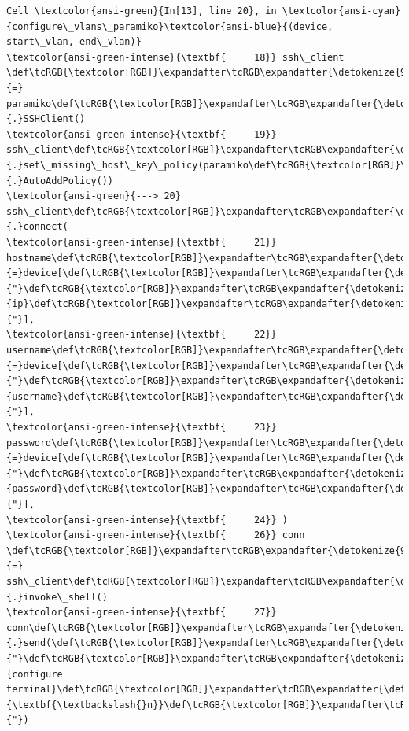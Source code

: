 \documentclass[11pt]{article}
\begin{document}
\begin{Verbatim}[commandchars=\\\{\}, frame=single, framerule=2mm, rulecolor=\color{outerrorbackground}]
Cell \textcolor{ansi-green}{In[13], line 20}, in \textcolor{ansi-cyan}{configure\_vlans\_paramiko}\textcolor{ansi-blue}{(device, start\_vlan, end\_vlan)}
\textcolor{ansi-green-intense}{\textbf{     18}} ssh\_client \def\tcRGB{\textcolor[RGB]}\expandafter\tcRGB\expandafter{\detokenize{98,98,98}}{=} paramiko\def\tcRGB{\textcolor[RGB]}\expandafter\tcRGB\expandafter{\detokenize{98,98,98}}{.}SSHClient()
\textcolor{ansi-green-intense}{\textbf{     19}} ssh\_client\def\tcRGB{\textcolor[RGB]}\expandafter\tcRGB\expandafter{\detokenize{98,98,98}}{.}set\_missing\_host\_key\_policy(paramiko\def\tcRGB{\textcolor[RGB]}\expandafter\tcRGB\expandafter{\detokenize{98,98,98}}{.}AutoAddPolicy())
\textcolor{ansi-green}{---> 20} ssh\_client\def\tcRGB{\textcolor[RGB]}\expandafter\tcRGB\expandafter{\detokenize{98,98,98}}{.}connect(
\textcolor{ansi-green-intense}{\textbf{     21}}     hostname\def\tcRGB{\textcolor[RGB]}\expandafter\tcRGB\expandafter{\detokenize{98,98,98}}{=}device[\def\tcRGB{\textcolor[RGB]}\expandafter\tcRGB\expandafter{\detokenize{175,0,0}}{"}\def\tcRGB{\textcolor[RGB]}\expandafter\tcRGB\expandafter{\detokenize{175,0,0}}{ip}\def\tcRGB{\textcolor[RGB]}\expandafter\tcRGB\expandafter{\detokenize{175,0,0}}{"}],
\textcolor{ansi-green-intense}{\textbf{     22}}     username\def\tcRGB{\textcolor[RGB]}\expandafter\tcRGB\expandafter{\detokenize{98,98,98}}{=}device[\def\tcRGB{\textcolor[RGB]}\expandafter\tcRGB\expandafter{\detokenize{175,0,0}}{"}\def\tcRGB{\textcolor[RGB]}\expandafter\tcRGB\expandafter{\detokenize{175,0,0}}{username}\def\tcRGB{\textcolor[RGB]}\expandafter\tcRGB\expandafter{\detokenize{175,0,0}}{"}],
\textcolor{ansi-green-intense}{\textbf{     23}}     password\def\tcRGB{\textcolor[RGB]}\expandafter\tcRGB\expandafter{\detokenize{98,98,98}}{=}device[\def\tcRGB{\textcolor[RGB]}\expandafter\tcRGB\expandafter{\detokenize{175,0,0}}{"}\def\tcRGB{\textcolor[RGB]}\expandafter\tcRGB\expandafter{\detokenize{175,0,0}}{password}\def\tcRGB{\textcolor[RGB]}\expandafter\tcRGB\expandafter{\detokenize{175,0,0}}{"}],
\textcolor{ansi-green-intense}{\textbf{     24}} )
\textcolor{ansi-green-intense}{\textbf{     26}} conn \def\tcRGB{\textcolor[RGB]}\expandafter\tcRGB\expandafter{\detokenize{98,98,98}}{=} ssh\_client\def\tcRGB{\textcolor[RGB]}\expandafter\tcRGB\expandafter{\detokenize{98,98,98}}{.}invoke\_shell()
\textcolor{ansi-green-intense}{\textbf{     27}} conn\def\tcRGB{\textcolor[RGB]}\expandafter\tcRGB\expandafter{\detokenize{98,98,98}}{.}send(\def\tcRGB{\textcolor[RGB]}\expandafter\tcRGB\expandafter{\detokenize{175,0,0}}{"}\def\tcRGB{\textcolor[RGB]}\expandafter\tcRGB\expandafter{\detokenize{175,0,0}}{configure terminal}\def\tcRGB{\textcolor[RGB]}\expandafter\tcRGB\expandafter{\detokenize{175,95,0}}{\textbf{\textbackslash{}n}}\def\tcRGB{\textcolor[RGB]}\expandafter\tcRGB\expandafter{\detokenize{175,0,0}}{"})


\end{Verbatim}
\end{document}
